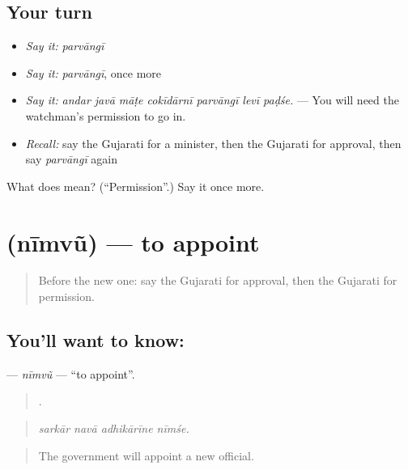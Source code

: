 \subsection*{Your turn}
\begin{itemize}
\raggedright
  \item \emph{Say it:} \emph{parvāngī}
  \item \emph{Say it:} \emph{parvāngī}, once more
  \item \emph{Say it:} \emph{andar javā māṭe cokīdārnī parvāngī levī paḍśe.} — You will need the watchman's permission to go in.
  \item \emph{Recall:} say the Gujarati for a minister, then the Gujarati for approval, then say \emph{parvāngī} again
\end{itemize}

\begin{tcolorbox}[breakable,colback=teal!4,colframe=teal!35!black,title={Before you move on}]
What does  mean? (\textquotedblleft{}Permission\textquotedblright{}.) Say it once more.
\end{tcolorbox}
\section[\texorpdfstring{\gu{નીમવું} (nīmvũ)}{નીમવું (nīmvũ)}]{ (nīmvũ) — to appoint}

\label{lesson:GU-C354-nimvu}



\begin{quote}
Before the new one: say the Gujarati for approval, then the Gujarati for permission.
\end{quote}

\subsection*{You'll want to know: }
\textbf{} — \emph{nīmvũ} — \textquotedblleft{}to appoint\textquotedblright{}.

\begin{quote}
   .
\end{quote}

\begin{quote}
\emph{sarkār navā adhikārīne nīmśe.}
\end{quote}

\begin{quote}
The government will appoint a new official.
\end{quote}

